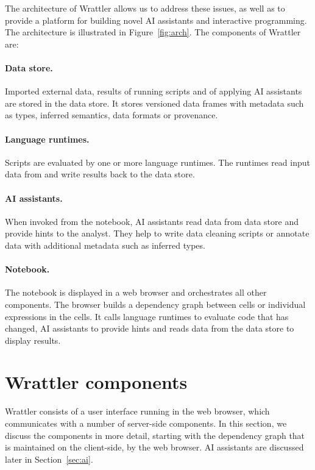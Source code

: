\documentclass[sigplan,preprint,10pt]{acmart}\settopmatter{printfolios=true,printccs=false,printacmref=false}
\theoremstyle{plain}
\theoremstyle{definition}
\begin{document}
The architecture of Wrattler allows us to address these issues, as well as to provide a platform
for building novel AI assistants and interactive programming. The architecture is illustrated
in Figure~\ref{fig:arch}. The components of Wrattler are:

\vspace{-0.25em}
\paragraph{Data store.} Imported external data, results of running scripts and of
applying AI assistants are stored in the data store. It stores versioned data frames with
metadata such as types, inferred semantics, data formats or provenance.

\vspace{-0.25em}
\paragraph{Language runtimes.} Scripts are evaluated by one or more language runtimes.
The runtimes read input data from and write results back to the data store.

\vspace{-0.25em}
\paragraph{AI assistants.} When invoked from the notebook, AI assistants read data
from data store and provide hints to the analyst. They help to write data cleaning
scripts or annotate data with additional metadata such as inferred types.

\vspace{-0.25em}
\paragraph{Notebook.} The notebook is displayed in a web browser and orchestrates
all other components. The browser builds a dependency graph between cells or individual
expressions in the cells. It calls language runtimes to evaluate code that has changed,
AI assistants to provide hints and reads data from the data store to display results.

\section{Wrattler components}
\label{sec:wrattler}

Wrattler consists of a user interface running in the web browser, which communicates with
a number of server-side components. In this section, we discuss the components in more 
detail, starting with the dependency graph that is maintained on the client-side, by the 
web browser. AI assistants are discussed later in Section~\ref{sec:ai}.
\end{document}

